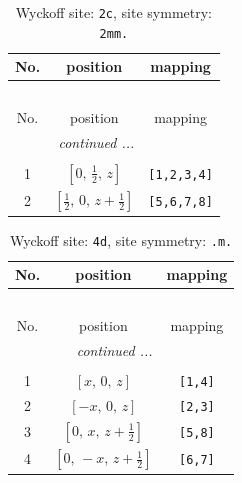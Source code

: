 \documentclass[fleqn,8pt]{jsarticle}
\begin{document}
\renewcommand{\arraystretch}{1.2}
\begin{longtable}{ccc}
\caption{Wyckoff site: {\tt 2c}, site symmetry: {\tt 2mm.}}
 \\
 \hline \hline
No. & position & mapping \\ \hline \endfirsthead

\multicolumn{2}{l}{\tablename\ \thetable{}} \\
 \hline \hline
No. & position & mapping \\ \hline \endhead

 \hline \hline
\multicolumn{2}{r}{\footnotesize\it continued ...} \\ \endfoot

 \hline \hline
\multicolumn{2}{r}{} \\ \endlastfoot

1 & $\left[ 0,\, \frac{1}{2},\, z \right]$ & {\tt [1,2,3,4]} \\ \hline
2 & $\left[ \frac{1}{2},\, 0,\, z + \frac{1}{2} \right]$ & {\tt [5,6,7,8]} \\
\end{longtable}
\renewcommand{\arraystretch}{1.2}
\begin{longtable}{ccc}
\caption{Wyckoff site: {\tt 4d}, site symmetry: {\tt .m.}}
 \\
 \hline \hline
No. & position & mapping \\ \hline \endfirsthead

\multicolumn{2}{l}{\tablename\ \thetable{}} \\
 \hline \hline
No. & position & mapping \\ \hline \endhead

 \hline \hline
\multicolumn{2}{r}{\footnotesize\it continued ...} \\ \endfoot

 \hline \hline
\multicolumn{2}{r}{} \\ \endlastfoot

1 & $\left[ x,\, 0,\, z \right]$ & {\tt [1,4]} \\ \hline
2 & $\left[ - x,\, 0,\, z \right]$ & {\tt [2,3]} \\ \hline
3 & $\left[ 0,\, x,\, z + \frac{1}{2} \right]$ & {\tt [5,8]} \\ \hline
4 & $\left[ 0,\, - x,\, z + \frac{1}{2} \right]$ & {\tt [6,7]} \\
\end{longtable}
\renewcommand{\arraystretch}{1.2}
\end{document}
